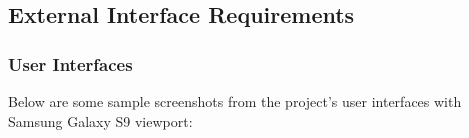 
\subsection{External Interface Requirements}

\subsubsection{User Interfaces}


Below are some sample screenshots from the project's user interfaces with Samsung Galaxy S9 viewport: \\
